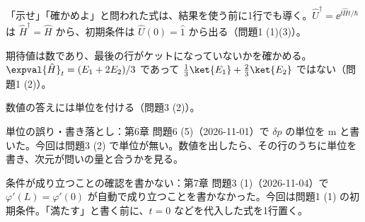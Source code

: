 \documentclass[uplatex,dvipdfmx,a4paper,11pt]{jsarticle}
\begin{document}
\matome
\begin{saitenichiran}
\end{saitenichiran}
\begin{daiji}
  \item 「示せ」「確かめよ」と問われた式は、結果を使う前に1行でも導く。$\hat{U}^{\dagger}=\ee^{\ii\hat{H}t/\hbar}$ は $\hat{H}^{\dagger}=\hat{H}$ から、初期条件は $\hat{U}(0)=\hat{1}$ から出る（問題1 (1)(3)）。
  \item 期待値は数であり、最後の行がケットになっていないかを確かめる。$\expval{\hat{H}}_{t}=(E_{1}+2E_{2})/3$ であって $\frac{1}{3}\ket{E_{1}}+\frac{2}{3}\ket{E_{2}}$ ではない（問題1 (2)）。
  \item 数値の答えには単位を付ける（問題3 (2)）。
\end{daiji}
\begin{maemo}
  \item 単位の誤り・書き落とし：第6章 問題6 (5)（2026-11-01）で $\delta p$ の単位を $\unit{\metre}$ と書いた。今回は問題3 (2) で単位が無い。数値を出したら、その行のうちに単位を書き、次元が問いの量と合うかを見る。
  \item 条件が成り立つことの確認を書かない：第7章 問題3 (1)（2026-11-04）で $\varphi'(L)=\varphi'(0)$ が自動で成り立つことを書かなかった。今回は問題1 (1) の初期条件。「満たす」と書く前に、$t=0$ などを代入した式を1行置く。
\end{maemo}
\end{document}
